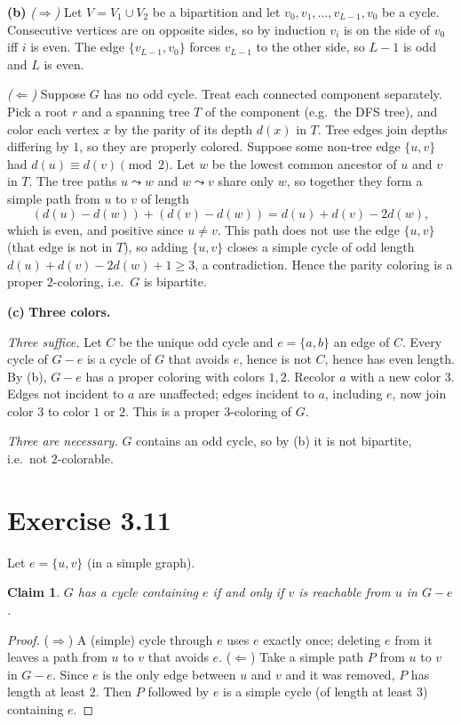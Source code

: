 \documentclass[11pt]{article}
\newtheorem*{claim}{Claim}
\theoremstyle{definition}
\begin{document}
\textbf{(b)} \emph{($\Rightarrow$)} Let $V=V_1\cup V_2$ be a bipartition and let
$v_0,v_1,\dots,v_{L-1},v_0$ be a cycle. Consecutive vertices are on opposite sides, so by induction $v_i$ is on the
side of $v_0$ iff $i$ is even. The edge $\{v_{L-1},v_0\}$ forces $v_{L-1}$ to the other side, so $L-1$ is odd and
$L$ is even.

\emph{($\Leftarrow$)} Suppose $G$ has no odd cycle. Treat each connected component separately. Pick a root $r$ and
a spanning tree $T$ of the component (e.g.\ the DFS tree), and color each vertex $x$ by the parity of its depth
$d(x)$ in $T$. Tree edges join depths differing by $1$, so they are properly colored. Suppose some non-tree edge
$\{u,v\}$ had $d(u)\equiv d(v)\pmod 2$. Let $w$ be the lowest common ancestor of $u$ and $v$ in $T$. The tree paths
$u\leadsto w$ and $w\leadsto v$ share only $w$, so together they form a simple path from $u$ to $v$ of length
\[
  (d(u)-d(w))+(d(v)-d(w))=d(u)+d(v)-2d(w),
\]
which is even, and positive since $u\neq v$. This path does not use the edge $\{u,v\}$ (that edge is not in $T$),
so adding $\{u,v\}$ closes a simple cycle of odd length $d(u)+d(v)-2d(w)+1\ge3$, a contradiction. Hence the parity
coloring is a proper $2$-coloring, i.e.\ $G$ is bipartite.

\textbf{(c)} \textbf{Three colors.}

\emph{Three suffice.} Let $C$ be the unique odd cycle and $e=\{a,b\}$ an edge of $C$. Every cycle of $G-e$ is a
cycle of $G$ that avoids $e$, hence is not $C$, hence has even length. By (b), $G-e$ has a proper coloring with
colors $1,2$. Recolor $a$ with a new color $3$. Edges not incident to $a$ are unaffected; edges incident to $a$,
including $e$, now join color $3$ to color $1$ or $2$. This is a proper $3$-coloring of $G$.

\emph{Three are necessary.} $G$ contains an odd cycle, so by (b) it is not bipartite, i.e.\ not $2$-colorable.

\section*{Exercise 3.11}

Let $e=\{u,v\}$ (in a simple graph).

\begin{claim}
$G$ has a cycle containing $e$ if and only if $v$ is reachable from $u$ in $G-e$.
\end{claim}
\begin{proof}
($\Rightarrow$) A (simple) cycle through $e$ uses $e$ exactly once; deleting $e$ from it leaves a path from $u$ to
$v$ that avoids $e$.
($\Leftarrow$) Take a simple path $P$ from $u$ to $v$ in $G-e$. Since $e$ is the only edge between $u$ and $v$ and
it was removed, $P$ has length at least $2$. Then $P$ followed by $e$ is a simple cycle (of length at least $3$)
containing $e$.
\end{proof}
\end{document}
